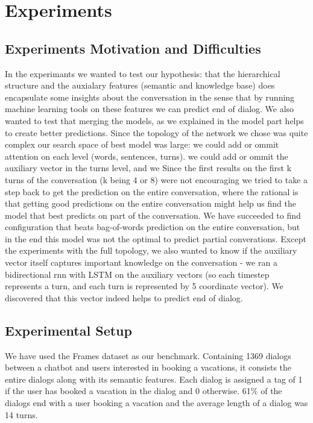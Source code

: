 \section{Experiments}\label{sec:exp}
\subsection{Experiments Motivation and Difficulties}
In the experimants we wanted to test our hypothesis: that the hierarchical 
structure and the auxialary features (semantic and knowledge base) does 
encapsulate some insights about the conversation in the sense that by running 
machine learning tools on these features we can predict end of dialog.
We also wanted to test that merging the models, as we explained in the model part
helps to create better predictions.
Since the topology of the network we chose was quite complex our search space of best model 
was large: we could add or ommit attention on each level (words, sentences, turns).
we could add or ommit the auxiliary vector in the turns level, and we 
Since the first results on the first k turns of the conversation (k being 4 or 8)
were not encouraging we tried to take a step back to get the prediction on the entire conversation,
where the rational is that getting good predictions on the entire conversation might help
us find the model that best predicts on part of the conversation.
We have succeeded to find configuration that beats bag-of-words prediction on the entire conversation,
but in the end this model was not the optimal to predict partial converations.
Except the experiments with the full topology, we also wanted to know if the auxiliary vector itself
captures important knowledge on the conversation - we ran a bidirectional rnn with LSTM on the auxiliary 
vectors (so each timestep represents a turn, and each turn is represented by 5 coordinate vector).
We discovered that this vector indeed helps to predict end of dialog.

\subsection{Experimental Setup}
We have used the Frames dataset \cite{frames} as 
our benchmark. Containing 1369 dialogs between 
a chatbot and users interested in booking a vacations, 
it consists the entire dialogs along with its semantic features. 
Each dialog is assigned a tag of 1 if the user has booked a vacation 
in the dialog and 0 otherwise. 61\% of the dialogs end with a user 
booking a vacation and the average length of a dialog was 14 turns. 

